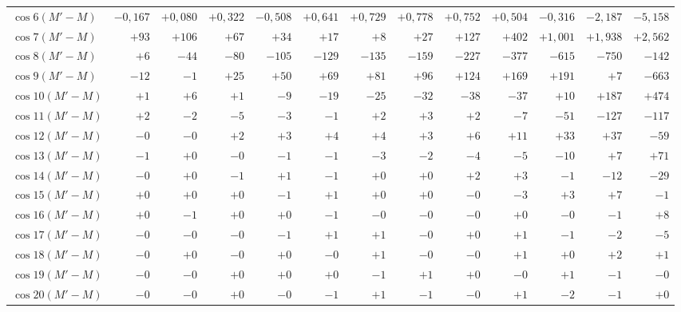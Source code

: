 \begin{landscape}
\begin{longtable}{@{}l|r|r|r|r|r|r|r|r|r|r|r|r@{}}
\(\cos 6(M'-M)\) & \(-0{,}167\) & \(+0{,}080\) & \(+0{,}322\) & \(-0{,}508\) & \(+0{,}641\) & \(+0{,}729\) & \(+0{,}778\) & \(+0{,}752\) & \(+0{,}504\) & \(-0{,}316\) & \(-2{,}187\) & \(-5{,}158\)\\
\(\cos 7(M'-M)\) & \(+93\) & \(+106\) & \(+67\) & \(+34\) & \(+17\) & \(+8\) & \(+27\) & \(+127\) & \(+402\) & \(+1{,}001\) & \(+1{,}938\) & \(+2{,}562\)\\
\(\cos 8(M'-M)\) & \(+6\) & \(-44\) & \(-80\) & \(-105\) & \(-129\) & \(-135\) & \(-159\) & \(-227\) & \(-377\) & \(-615\) & \(-750\) & \(-142\)\\
\(\cos 9(M'-M)\) & \(-12\) & \(-1\) & \(+25\) & \(+50\) & \(+69\) & \(+81\) & \(+96\) & \(+124\) & \(+169\) & \(+191\) & \(+7\) & \(-663\)\\
\(\cos 10(M'-M)\) & \(+1\) & \(+6\) & \(+1\) & \(-9\) & \(-19\) & \(-25\) & \(-32\) & \(-38\) & \(-37\) & \(+10\) & \(+187\) & \(+474\)\\
\(\cos 11(M'-M)\) & \(+2\) & \(-2\) & \(-5\) & \(-3\) & \(-1\) & \(+2\) & \(+3\) & \(+2\) & \(-7\) & \(-51\) & \(-127\) & \(-117\)\\
\(\cos 12(M'-M)\) & \(-0\) & \(-0\) & \(+2\) & \(+3\) & \(+4\) & \(+4\) & \(+3\) & \(+6\) & \(+11\) & \(+33\) & \(+37\) & \(-59\)\\
\(\cos 13(M'-M)\) & \(-1\) & \(+0\) & \(-0\) & \(-1\) & \(-1\) & \(-3\) & \(-2\) & \(-4\) & \(-5\) & \(-10\) & \(+7\) & \(+71\)\\
\(\cos 14(M'-M)\) & \(-0\) & \(+0\) & \(-1\) & \(+1\) & \(-1\) & \(+0\) & \(+0\) & \(+2\) & \(+3\) & \(-1\) & \(-12\) & \(-29\)\\
\(\cos 15(M'-M)\) & \(+0\) & \(+0\) & \(+0\) & \(-1\) & \(+1\) & \(+0\) & \(+0\) & \(-0\) & \(-3\) & \(+3\) & \(+7\) & \(-1\)\\
\(\cos 16(M'-M)\) & \(+0\) & \(-1\) & \(+0\) & \(+0\) & \(-1\) & \(-0\) & \(-0\) & \(-0\) & \(+0\) & \(-0\) & \(-1\) & \(+8\)\\
\(\cos 17(M'-M)\) & \(-0\) & \(-0\) & \(-0\) & \(-1\) & \(+1\) & \(+1\) & \(-0\) & \(+0\) & \(+1\) & \(-1\) & \(-2\) & \(-5\)\\
\(\cos 18(M'-M)\) & \(-0\) & \(+0\) & \(-0\) & \(+0\) & \(-0\) & \(+1\) & \(-0\) & \(-0\) & \(+1\) & \(+0\) & \(+2\) & \(+1\)\\
\(\cos 19(M'-M)\) & \(-0\) & \(-0\) & \(+0\) & \(+0\) & \(+0\) & \(-1\) & \(+1\) & \(+0\) & \(-0\) & \(+1\) & \(-1\) & \(-0\)\\
\(\cos 20(M'-M)\) & \(-0\) & \(-0\) & \(+0\) & \(-0\) & \(-1\) & \(+1\) & \(-1\) & \(-0\) & \(+1\) & \(-2\) & \(-1\) & \(+0\)\\

\end{longtable}
\end{landscape}
